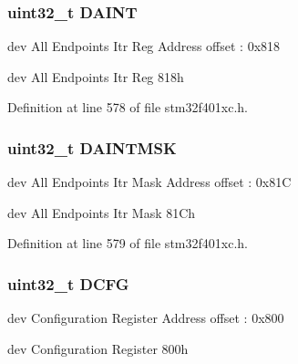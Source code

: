 \subsubsection[{\texorpdfstring{D\+A\+I\+NT}{DAINT}}]{ uint32\+\_\+t D\+A\+I\+NT}\hypertarget{struct_u_s_b___o_t_g___device_type_def_a4e15c273373694f64b3f70226cb3ac35}{}\label{struct_u_s_b___o_t_g___device_type_def_a4e15c273373694f64b3f70226cb3ac35}
dev All Endpoints Itr Reg Address offset \+: 0x818

dev All Endpoints Itr Reg 818h 

Definition at line 578 of file stm32f401xc.\+h.

\subsubsection[{\texorpdfstring{D\+A\+I\+N\+T\+M\+SK}{DAINTMSK}}]{ uint32\+\_\+t D\+A\+I\+N\+T\+M\+SK}\hypertarget{struct_u_s_b___o_t_g___device_type_def_a2c8f65655aa14ec9ba63c9d0655223ec}{}\label{struct_u_s_b___o_t_g___device_type_def_a2c8f65655aa14ec9ba63c9d0655223ec}
dev All Endpoints Itr Mask Address offset \+: 0x81C

dev All Endpoints Itr Mask 81\+Ch 

Definition at line 579 of file stm32f401xc.\+h.

\subsubsection[{\texorpdfstring{D\+C\+FG}{DCFG}}]{ uint32\+\_\+t D\+C\+FG}\hypertarget{struct_u_s_b___o_t_g___device_type_def_a9a163a0d5cfce7238b38067a1a53b324}{}\label{struct_u_s_b___o_t_g___device_type_def_a9a163a0d5cfce7238b38067a1a53b324}
dev Configuration Register Address offset \+: 0x800

dev Configuration Register 800h 

